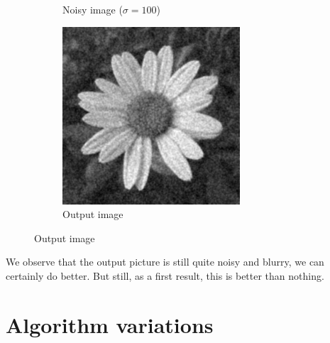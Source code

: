 \begin{figure}
\begin{subfigure}[b]{0.32\textwidth}
        \caption{Noisy image (\(\sigma=100\))}
    \end{subfigure}
    \begin{subfigure}[b]{0.32\textwidth}
        \includegraphics[width=\textwidth]{img/flowerOutput.png}
        \caption{Output image}
    \end{subfigure}
\end{figure}

We observe that the output picture is still quite noisy and blurry, we can certainly do better. But still, as a first result, this is better than nothing.

\section{Algorithm variations}

